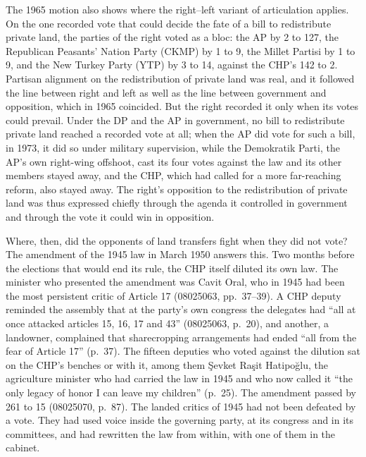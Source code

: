 \documentclass[12pt]{article}
\begin{document}
The 1965 motion also shows where the right--left variant of articulation applies. On the one recorded vote that could decide the fate of a bill to redistribute private land, the parties of the right voted as a bloc: the AP by 2 to 127, the Republican Peasants' Nation Party (CKMP) by 1 to 9, the Millet Partisi by 1 to 9, and the New Turkey Party (YTP) by 3 to 14, against the CHP's 142 to 2. Partisan alignment on the redistribution of private land was real, and it followed the line between right and left as well as the line between government and opposition, which in 1965 coincided. But the right recorded it only when its votes could prevail. Under the DP and the AP in government, no bill to redistribute private land reached a recorded vote at all; when the AP did vote for such a bill, in 1973, it did so under military supervision, while the Demokratik Parti, the AP's own right-wing offshoot, cast its four votes against the law and its other members stayed away, and the CHP, which had called for a more far-reaching reform, also stayed away. The right's opposition to the redistribution of private land was thus expressed chiefly through the agenda it controlled in government and through the vote it could win in opposition.

Where, then, did the opponents of land transfers fight when they did not vote? The amendment of the 1945 law in March 1950 answers this. Two months before the elections that would end its rule, the CHP itself diluted its own law. The minister who presented the amendment was Cavit Oral, who in 1945 had been the most persistent critic of Article 17 (08025063, pp.~37--39). A CHP deputy reminded the assembly that at the party's own congress the delegates had ``all at once attacked articles 15, 16, 17 and 43'' (08025063, p.~20), and another, a landowner, complained that sharecropping arrangements had ended ``all from the fear of Article 17'' (p.~37). The fifteen deputies who voted against the dilution sat on the CHP's benches or with it, among them Şevket Raşit Hatipoğlu, the agriculture minister who had carried the law in 1945 and who now called it ``the only legacy of honor I can leave my children'' (p.~25). The amendment passed by 261 to 15 (08025070, p.~87). The landed critics of 1945 had not been defeated by a vote. They had used voice inside the governing party, at its congress and in its committees, and had rewritten the law from within, with one of them in the cabinet.
\end{document}

